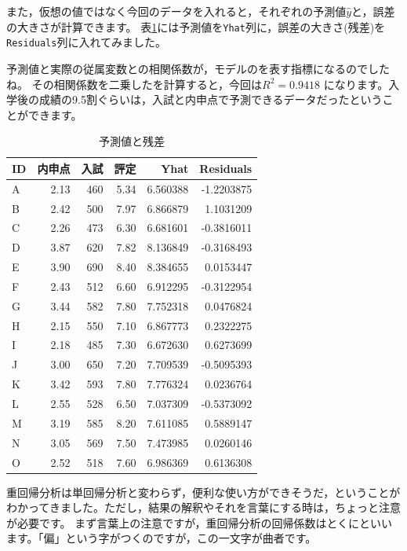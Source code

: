 \documentclass{ltjbook}
\begin{document}
また，仮想の値ではなく今回のデータを入れると，それぞれの予測値$\hat{y}$と，誤差の大きさが計算できます。
表\ref{tbl::10_02}には予測値を\texttt{Yhat}列に，誤差の大きさ(残差)を\texttt{Residuals}列に入れてみました。

予測値と実際の従属変数との相関係数が，モデルのを表す指標になるのでしたね。
その相関係数を二乗したを計算すると，今回は$R^2=0.9418$ になります。入学後の成績の9.5割ぐらいは，入試と内申点で予測できるデータだったということができます。
\begin{table}[ht]
	\caption{予測値と残差}
	\centering
	\begin{tabular}[t]{l|rrr|rr}
		\hline
		ID & 内申点  & 入試  & 評定   & Yhat     & Residuals  \\
		\hline
		A  & 2.13 & 460 & 5.34 & 6.560388 & -1.2203875 \\
		B  & 2.42 & 500 & 7.97 & 6.866879 & 1.1031209  \\
		C  & 2.26 & 473 & 6.30 & 6.681601 & -0.3816011 \\
		D  & 3.87 & 620 & 7.82 & 8.136849 & -0.3168493 \\
		E  & 3.90 & 690 & 8.40 & 8.384655 & 0.0153447  \\
		F  & 2.43 & 512 & 6.60 & 6.912295 & -0.3122954 \\
		G  & 3.44 & 582 & 7.80 & 7.752318 & 0.0476824  \\
		H  & 2.15 & 550 & 7.10 & 6.867773 & 0.2322275  \\
		I  & 2.18 & 485 & 7.30 & 6.672630 & 0.6273699  \\
		J  & 3.00 & 650 & 7.20 & 7.709539 & -0.5095393 \\
		K  & 3.42 & 593 & 7.80 & 7.776324 & 0.0236764  \\
		L  & 2.55 & 528 & 6.50 & 7.037309 & -0.5373092 \\
		M  & 3.19 & 585 & 8.20 & 7.611085 & 0.5889147  \\
		N  & 3.05 & 569 & 7.50 & 7.473985 & 0.0260146  \\
		O  & 2.52 & 518 & 7.60 & 6.986369 & 0.6136308  \\
		\hline
	\end{tabular}
	\label{tbl::10_02}
\end{table}

重回帰分析は単回帰分析と変わらず，便利な使い方ができそうだ，ということがわかってきました。ただし，結果の解釈やそれを言葉にする時は，ちょっと注意が必要です。
まず言葉上の注意ですが，重回帰分析の回帰係数はとくにといいます。「偏」という字がつくのですが，この一文字が曲者です。
\end{document}
